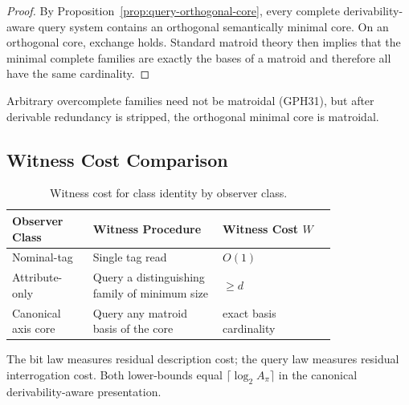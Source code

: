 \begin{proof}
By Proposition~\ref{prop:query-orthogonal-core}, every complete derivability-aware query system contains an orthogonal semantically minimal core. On an orthogonal core, exchange holds. Standard matroid theory then implies that the minimal complete families are exactly the bases of a matroid and therefore all have the same cardinality. 
\end{proof}

\begin{remark}
Arbitrary overcomplete families need not be matroidal (GPH31), but after derivable redundancy is stripped, the orthogonal minimal core is matroidal. 
\end{remark}

\subsection{Witness Cost Comparison}

\begin{table}[h]
\centering
\small
\begin{tabular}{|>{\raggedright\arraybackslash}m{0.20\linewidth}|>{\raggedright\arraybackslash}m{0.32\linewidth}|>{\raggedright\arraybackslash}m{0.28\linewidth}|}
\hline
\textbf{Observer Class} & \textbf{Witness Procedure} & \textbf{Witness Cost $W$} \\
\hline
Nominal-tag & Single tag read & $O(1)$ \\
Attribute-only & Query a distinguishing family of minimum size & $\ge d$ \\
Canonical axis core & Query any matroid basis of the core & exact basis cardinality \\
\hline
\end{tabular}
\medskip
\caption{Witness cost for class identity by observer class.}
\label{tab:witness-comparison}
\end{table}

\begin{remark}
The bit law measures residual description cost; the query law measures residual interrogation cost. Both lower-bounds equal $\lceil \log_2 A_{\pi} \rceil$ in the canonical derivability-aware presentation.
\end{remark}
